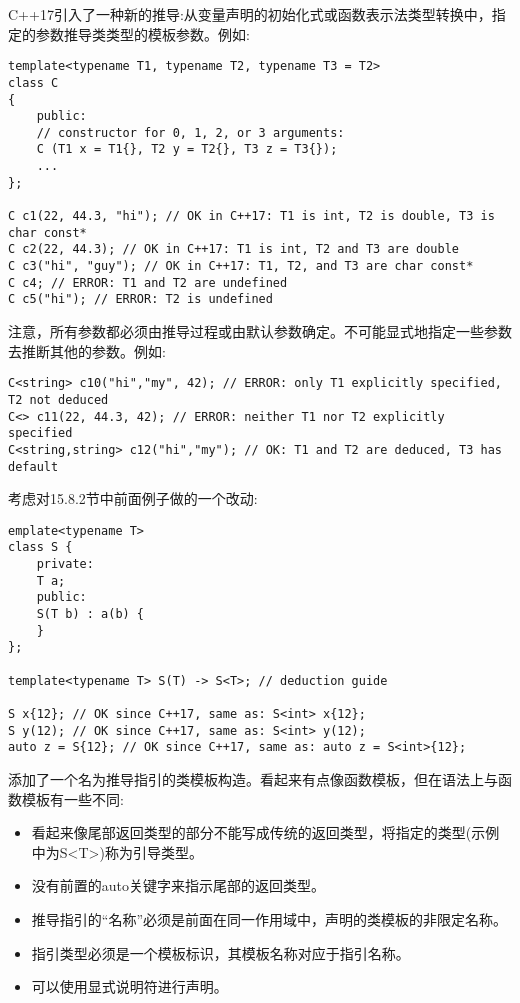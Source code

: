 
C++17引入了一种新的推导:从变量声明的初始化式或函数表示法类型转换中，指定的参数推导类类型的模板参数。例如:

\begin{lstlisting}[style=styleCXX]
template<typename T1, typename T2, typename T3 = T2>
class C
{
	public:
	// constructor for 0, 1, 2, or 3 arguments:
	C (T1 x = T1{}, T2 y = T2{}, T3 z = T3{});
	...
};

C c1(22, 44.3, "hi"); // OK in C++17: T1 is int, T2 is double, T3 is char const*
C c2(22, 44.3); // OK in C++17: T1 is int, T2 and T3 are double
C c3("hi", "guy"); // OK in C++17: T1, T2, and T3 are char const*
C c4; // ERROR: T1 and T2 are undefined
C c5("hi"); // ERROR: T2 is undefined
\end{lstlisting}

注意，所有参数都必须由推导过程或由默认参数确定。不可能显式地指定一些参数去推断其他的参数。例如:

\begin{lstlisting}[style=styleCXX]
C<string> c10("hi","my", 42); // ERROR: only T1 explicitly specified, T2 not deduced
C<> c11(22, 44.3, 42); // ERROR: neither T1 nor T2 explicitly specified
C<string,string> c12("hi","my"); // OK: T1 and T2 are deduced, T3 has default
\end{lstlisting}


考虑对15.8.2节中前面例子做的一个改动:

\begin{lstlisting}[style=styleCXX]
emplate<typename T>
class S {
	private:
	T a;
	public:
	S(T b) : a(b) {
	}
};

template<typename T> S(T) -> S<T>; // deduction guide

S x{12}; // OK since C++17, same as: S<int> x{12};
S y(12); // OK since C++17, same as: S<int> y(12);
auto z = S{12}; // OK since C++17, same as: auto z = S<int>{12};
\end{lstlisting}

添加了一个名为推导指引的类模板构造。看起来有点像函数模板，但在语法上与函数模板有一些不同:

\begin{itemize}
\item 
看起来像尾部返回类型的部分不能写成传统的返回类型，将指定的类型(示例中为S<T>)称为引导类型。

\item 
没有前置的auto关键字来指示尾部的返回类型。

\item 
推导指引的“名称”必须是前面在同一作用域中，声明的类模板的非限定名称。

\item 
指引类型必须是一个模板标识，其模板名称对应于指引名称。

\item 
可以使用显式说明符进行声明。
\end{itemize}	

